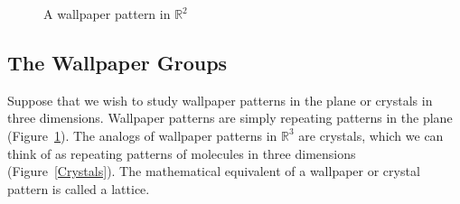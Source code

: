 \begin{figure}[thb]
\begin{center}
\end{center}
\caption{A wallpaper pattern in ${\mathbb R}^2$}
\label{Wallpaper}
\end{figure}
 
 
 
\subsection*{The Wallpaper Groups}
 
 
 
Suppose that we wish to study wallpaper patterns in the plane or
crystals in three dimensions. Wallpaper patterns are simply repeating
patterns in the plane (Figure~\ref{Wallpaper}). The analogs of
wallpaper patterns in ${\mathbb R}^3$ are crystals, which we can think of
as repeating patterns of molecules in three dimensions
(Figure~\ref{Crystals}). The mathematical equivalent of a wallpaper or
crystal pattern is called a  lattice. 
 
 
 
